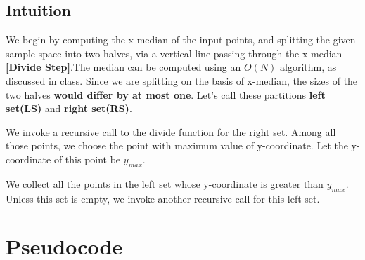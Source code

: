 \documentclass{article}
\begin{document}
\subsection{Intuition}
We begin by computing the x-median of the input points, and splitting the given sample space into two halves, via a vertical line passing through the x-median\textbf{ [Divide Step]}.The median can be computed using an $O(N)$ algorithm, as discussed in class. Since we are splitting on the basis of x-median, the sizes of the two halves \textbf{would differ by at most one}. Let's call these partitions \textbf{left set(LS)} and \textbf{right set(RS)}.

We invoke a recursive call to the divide function for the right set. Among all those points, we choose the point with maximum value of y-coordinate. Let the y-coordinate of this point be $y_{max}$.
\par
We collect all the points in the left set whose y-coordinate is greater than $y_{max}$. Unless this set is empty, we invoke another recursive call for this left set.

\newpage
\section{Pseudocode}

\end{document}
